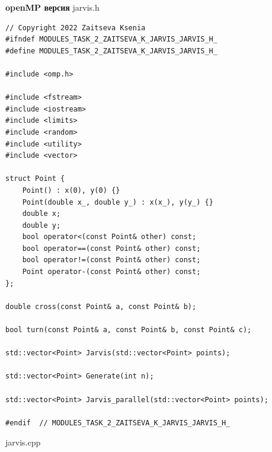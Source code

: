 \documentclass{report}
\begin{document}
\textbf{openMP версия}
\newline
\newline jarvis.h
\begin{lstlisting}
// Copyright 2022 Zaitseva Ksenia
#ifndef MODULES_TASK_2_ZAITSEVA_K_JARVIS_JARVIS_H_
#define MODULES_TASK_2_ZAITSEVA_K_JARVIS_JARVIS_H_

#include <omp.h>

#include <fstream>
#include <iostream>
#include <limits>
#include <random>
#include <utility>
#include <vector>

struct Point {
	Point() : x(0), y(0) {}
	Point(double x_, double y_) : x(x_), y(y_) {}
	double x;
	double y;
	bool operator<(const Point& other) const;
	bool operator==(const Point& other) const;
	bool operator!=(const Point& other) const;
	Point operator-(const Point& other) const;
};

double cross(const Point& a, const Point& b);

bool turn(const Point& a, const Point& b, const Point& c);

std::vector<Point> Jarvis(std::vector<Point> points);

std::vector<Point> Generate(int n);

std::vector<Point> Jarvis_parallel(std::vector<Point> points);

#endif  // MODULES_TASK_2_ZAITSEVA_K_JARVIS_JARVIS_H_

\end{lstlisting}
jarvis.cpp
\end{document}
